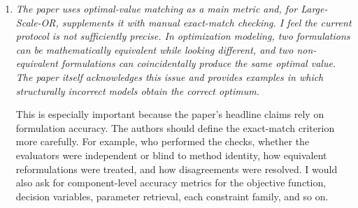 \documentclass[11pt]{article}
\newcommand{\edit}[1]{{\color{hopkins-blue}\itshape #1}}
\begin{document}
\begin{enumerate}[label=(AssoE.\arabic*),leftmargin=*]
\begin{enumerate}[label=(R1.Major.\arabic*),leftmargin=*]
These experiments assess dependence on external reference examples and workflow availability within Large-Scale-OR. They do not remove fixed prompt examples, class definitions, pretrained knowledge, or potentially overlapping mathematical structures under other labels. Moreover, the route restriction in Experiment~2 is determined by the annotated fold and is visible to the classifier, making it a controlled workflow-availability test rather than unaided recognition of an unknown problem type. The reported objective-match rates incorporate execution reliability and do not certify complete formulation or solution correctness. Consequently, these results provide additional, bounded evidence addressing the reviewer's concern, rather than proving generalization to entirely unseen modelling archetypes or operational deployment settings.


\vspace{2mm}
\noindent\textbf{4. Scope of the Air-NRM Case Study}


[Response to be added.]





\item \edit{The paper uses optimal-value matching as a main metric and, for Large-Scale-OR, supplements it with manual exact-match checking. I feel the current protocol is not sufficiently precise. In optimization modeling, two formulations can be mathematically equivalent while looking different, and two non-equivalent formulations can coincidentally produce the same optimal value. The paper itself acknowledges this issue and provides examples in which structurally incorrect models obtain the correct optimum.

This is especially important because the paper's headline claims rely on formulation accuracy. The authors should define the exact-match criterion more carefully. For example, who performed the checks, whether the evaluators were independent or blind to method identity, how equivalent reformulations were treated, and how disagreements were resolved. I would also ask for component-level accuracy metrics for the objective function, decision variables, parameter retrieval, each constraint family, and so on.

}
\end{enumerate}
\end{enumerate}
\end{document}
